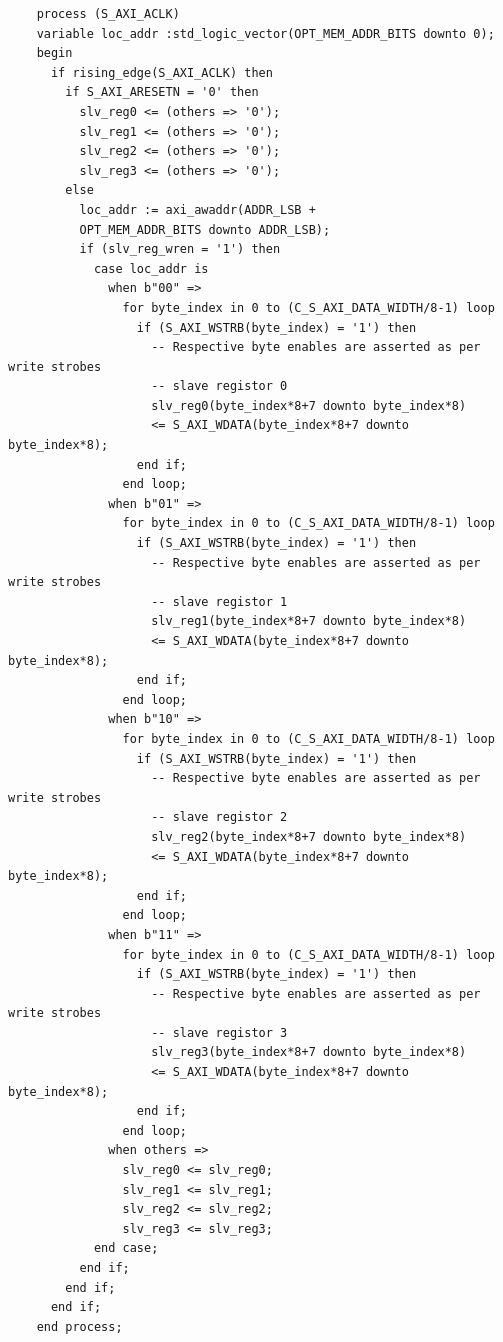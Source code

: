 \documentclass[a4paper,openright,12pt]{report}
\begin{document}
\begin{lstlisting}
	process (S_AXI_ACLK)
	variable loc_addr :std_logic_vector(OPT_MEM_ADDR_BITS downto 0); 
	begin
	  if rising_edge(S_AXI_ACLK) then 
	    if S_AXI_ARESETN = '0' then
	      slv_reg0 <= (others => '0');
	      slv_reg1 <= (others => '0');
	      slv_reg2 <= (others => '0');
	      slv_reg3 <= (others => '0');
	    else
	      loc_addr := axi_awaddr(ADDR_LSB +
          OPT_MEM_ADDR_BITS downto ADDR_LSB);
	      if (slv_reg_wren = '1') then
	        case loc_addr is
	          when b"00" =>
	            for byte_index in 0 to (C_S_AXI_DATA_WIDTH/8-1) loop
	              if (S_AXI_WSTRB(byte_index) = '1') then
	                -- Respective byte enables are asserted as per write strobes                   
	                -- slave registor 0
	                slv_reg0(byte_index*8+7 downto byte_index*8) 
                    <= S_AXI_WDATA(byte_index*8+7 downto byte_index*8);
	              end if;
	            end loop;
	          when b"01" =>
	            for byte_index in 0 to (C_S_AXI_DATA_WIDTH/8-1) loop
	              if (S_AXI_WSTRB(byte_index) = '1') then
	                -- Respective byte enables are asserted as per write strobes                   
	                -- slave registor 1
	                slv_reg1(byte_index*8+7 downto byte_index*8)
                    <= S_AXI_WDATA(byte_index*8+7 downto byte_index*8);
	              end if;
	            end loop;
	          when b"10" =>
	            for byte_index in 0 to (C_S_AXI_DATA_WIDTH/8-1) loop
	              if (S_AXI_WSTRB(byte_index) = '1') then
	                -- Respective byte enables are asserted as per write strobes                   
	                -- slave registor 2
	                slv_reg2(byte_index*8+7 downto byte_index*8) 
                    <= S_AXI_WDATA(byte_index*8+7 downto byte_index*8);
	              end if;
	            end loop;
	          when b"11" =>
	            for byte_index in 0 to (C_S_AXI_DATA_WIDTH/8-1) loop
	              if (S_AXI_WSTRB(byte_index) = '1') then
	                -- Respective byte enables are asserted as per write strobes                   
	                -- slave registor 3
	                slv_reg3(byte_index*8+7 downto byte_index*8) 
                    <= S_AXI_WDATA(byte_index*8+7 downto byte_index*8);
	              end if;
	            end loop;
	          when others =>
	            slv_reg0 <= slv_reg0;
	            slv_reg1 <= slv_reg1;
	            slv_reg2 <= slv_reg2;
	            slv_reg3 <= slv_reg3;
	        end case;
	      end if;
	    end if;
	  end if;                   
	end process; 


\end{lstlisting}
\end{document}
